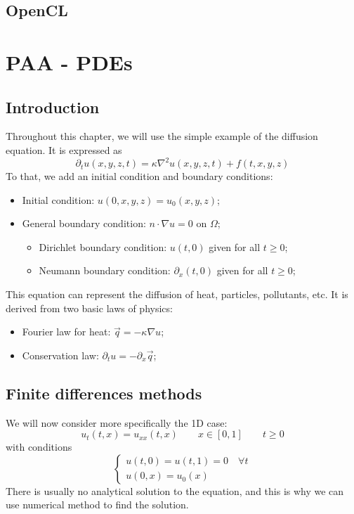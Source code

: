 \documentclass[12pt, openany]{report}
\theoremstyle{definition}
\begin{document}
\section{OpenCL}
\chapter{PAA - PDEs}
\section{Introduction}
Throughout this chapter, we will use the simple example of the diffusion equation. It is expressed as 
\begin{equation}
	\partial_t u(x,y,z,t) = \kappa \nabla^2 u(x,y,z,t) + f(t,x,y,z)
\end{equation}
To that, we add an initial condition and boundary conditions:
\begin{itemize}
	\item Initial condition: $u(0,x,y,z) = u_0(x,y,z)$;
	\item General boundary condition: $ n\cdot \nabla u=0$ on $\Omega$;
	\begin{itemize}
		\item Dirichlet boundary condition: $u(t,0)$ given for all $t\ge0$;
		\item Neumann boundary condition: $\partial_x(t,0)$ given for all $t\ge0$;
	\end{itemize}
\end{itemize}
This equation can represent the diffusion of heat, particles, pollutants, etc. It is derived from two basic laws of physics:
\begin{itemize}
	\item Fourier law for heat: $\vec q=-\kappa \nabla u$;
	\item Conservation law: $\partial_t u = -\partial_x \vec q$;
\end{itemize}
\section{Finite differences methods}
We will now consider more specifically the 1D case:
\begin{equation}
	u_t(t,x)=u_{xx}(t,x) \qquad x\in [0,1]\qquad t\ge 0
\end{equation}
with conditions 
\begin{equation}
	\begin{cases}
		u(t,0)=u(t,1) = 0 \quad \forall t\\
		u(0,x) = u_0(x)
	\end{cases}
\end{equation}
There is usually no analytical solution to the equation, and this is why we can use numerical method to find the solution. 
\end{document}
